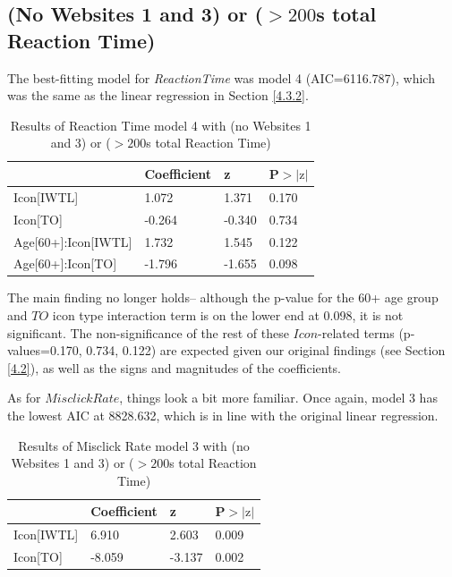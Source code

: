 \documentclass[12pt,twoside]{reedthesis}
\begin{document}
\subsection{(No Websites 1 and 3) or ($>200$s total Reaction Time)}\label{4.3.3}

    The best-fitting model for \textit{ReactionTime} was model 4 (AIC=6116.787), which was the same as the linear regression in Section \ref{4.3.2}.

    \begin{table}[H]
        \centering
        \begin{tabular}{| p{5cm} | p{2.5cm} | p{2.5cm} | p{2.5cm} |}
            \hline
            & Coefficient & z & P$>|\text{z}|$\\
            \hline
            Icon[IWTL] & 1.072 & 1.371 & 0.170\\
            \hline
            Icon[TO] & -0.264 & -0.340 & 0.734\\
            \hline
            Age[60+]:Icon[IWTL] & 1.732 &  1.545 & 0.122\\
            \hline
            Age[60+]:Icon[TO] & -1.796 & -1.655 & 0.098\\
            \hline
        \end{tabular}
        \caption{Results of Reaction Time model 4 with (no Websites 1 and 3) or ($>200$s total Reaction Time)}
        \label{n13_200_speed_m4}
    \end{table}

    The main finding no longer holds-- although the p-value for the 60+ age group and $TO$ icon type interaction term is on the lower end at 0.098, it is not significant. The non-significance of the rest of these $Icon$-related terms (p-values=0.170, 0.734, 0.122) are expected given our original findings (see Section \ref{4.2}), as well as the signs and magnitudes of the coefficients.


    As for $Misclick Rate$, things look a bit more familiar. Once again, model 3 has the lowest AIC at 8828.632, which is in line with the original linear regression. 

    \begin{table}[H]
        \centering
        \begin{tabular}{| p{3.5cm} | p{2.5cm} | p{2.5cm} | p{2.5cm} |}
            \hline
            & Coefficient & z & P$>|\text{z}|$\\
            \hline
            Icon[IWTL] & 6.910 & 2.603 & 0.009\\
            \hline
            Icon[TO] & -8.059 & -3.137 & 0.002\\
            \hline
        \end{tabular}
        \caption{Results of Misclick Rate model 3 with (no Websites 1 and 3) or ($>200$s total Reaction Time)}
        \label{n13_200_m3_mr}
    \end{table}
\end{document}
